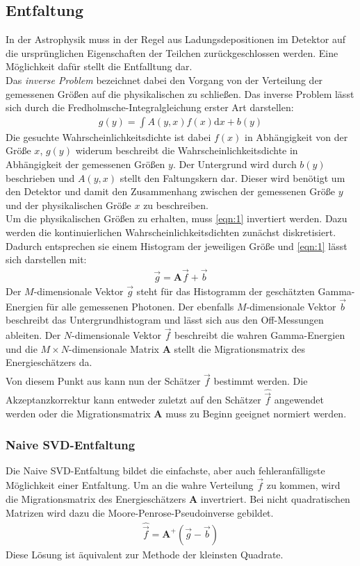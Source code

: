 \subsection{Entfaltung}
In der Astrophysik muss in der Regel aus Ladungsdepositionen im Detektor auf die ursprünglichen Eigenschaften der Teilchen zurückgeschlossen werden. Eine Möglichkeit dafür stellt die Entfalltung dar.\\
Das \textit{inverse Problem} bezeichnet dabei den Vorgang von der Verteilung der gemessenen Größen auf die physikalischen zu schließen. Das inverse Problem lässt sich durch die Fredholmsche-Integralgleichung erster Art darstellen:
\begin{align}
	g(y)=\int A(y,x)f(x)\text{d}x + b(y)
	\label{eqn:1}
\end{align}
Die gesuchte Wahrscheinlichkeitsdichte ist dabei $f(x)$ in Abhängigkeit von der Größe $x$, $g(y)$ widerum beschreibt die Wahrscheinlichkeitsdichte in Abhängigkeit der gemessenen Größen $y$. Der Untergrund wird durch $b(y)$ beschrieben und $A(y,x)$ stellt den Faltungskern dar. Dieser wird benötigt um den Detektor und damit den Zusammenhang zwischen der gemessenen Größe $y$ und der physikalischen Größe $x$ zu beschreiben. \\
Um die physikalischen Größen zu erhalten, muss \eqref{eqn:1} invertiert werden. Dazu werden die kontinuierlichen Wahrscheinlichkeitsdichten zunächst diskretisiert. Dadurch entsprechen sie einem Histogram der jeweiligen Größe und \eqref{eqn:1} lässt sich darstellen mit:
\begin{align}
	\vec{g} = \pmb{A}\vec{f} + \vec{b}
\end{align}
Der $M$-dimensionale Vektor $\vec{g}$ steht für das Histogramm der geschätzten Gamma-Energien für alle gemessenen Photonen. Der ebenfalls $M$-dimensionale Vektor $\vec{b}$ beschreibt das Untergrundhistogram und lässt sich aus den Off-Messungen ableiten. Der $N$-dimensionale Vektor $\vec{f}$ beschreibt die wahren Gamma-Energien und die $M\times N$-dimensionale Matrix $\pmb{A}$ stellt die Migrationsmatrix des Energieschätzers da. \\
Von diesem Punkt aus kann nun der Schätzer $\hat{\vec{f}}$ bestimmt werden. Die Akzeptanzkorrektur kann entweder zuletzt auf den Schätzer $\hat{\vec{f}}$ angewendet werden oder die Migrationsmatrix $\pmb{A}$ muss zu Beginn geeignet normiert werden.
\subsubsection{Naive SVD-Entfaltung}
Die Naive SVD-Entfaltung bildet die einfachste, aber auch fehleranfälligste Möglichkeit einer Entfaltung. Um an die wahre Verteilung $\vec{f}$ zu kommen, wird die Migrationsmatrix des Energieschätzers $\pmb{A}$ invertriert. Bei nicht quadratischen Matrizen wird dazu die Moore-Penrose-Pseudoinverse gebildet.\\
\begin{align}
	\hat{\vec{f}} = \pmb{A}^{+}(\vec{g} - \vec{b})
\end{align}
Diese Lösung ist äquivalent zur Methode der kleinsten Quadrate.
